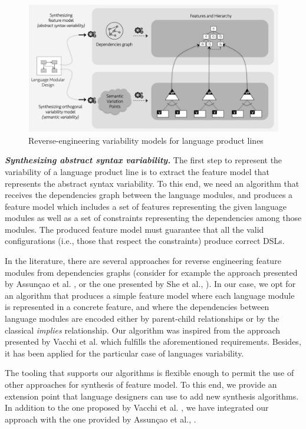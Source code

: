 \begin{figure}
\centering
\includegraphics[width=1\linewidth]{images/reverse-engineering-vm.png}
\caption{Reverse-engineering variability models for language product lines}
\label{fig:everse-engineering-vm}
\end{figure}

\vspace{2mm}
\textit{\textbf{Synthesizing abstract syntax variability.}} The first step to represent the variability of a language product line is to extract the feature model that represents the abstract syntax variability. To this end, we need an algorithm that receives the dependencies graph between the language modules, and produces a feature model which includes a set of features representing the given language modules as well as a set of constraints representing the dependencies among those modules. The produced feature model must guarantee that all the valid configurations (i.e., those that respect the constraints) produce correct DSLs.

In the literature, there are several approaches for reverse engineering feature modules from dependencies graphs (consider for example the approach presented by Assun\c{c}ao et al. \cite{Assuncao:2015}, or the one presented by She et al., \cite{She:2014}). In our case, we opt for an algorithm that produces a simple feature model where each language module is represented in a concrete feature, and where the dependencies between language modules are encoded either by parent-child relationships or by the classical \textit{implies} relationship. Our algorithm was inspired from the approach presented by Vacchi et al. \cite{Vacchi:2013} which fulfills the aforementioned requirements. Besides, it has been applied for the particular case of languages variability. 

The tooling that supports our algorithms is flexible enough to permit the use of other approaches for synthesis of feature model. To this end, we provide an extension point that language designers can use to add new synthesis algorithms. In addition to the one proposed by Vacchi et al. \cite{Vacchi:2013}, we have integrated our approach with the one provided by Assun\c{c}ao et al., \cite{Assuncao:2015}.

